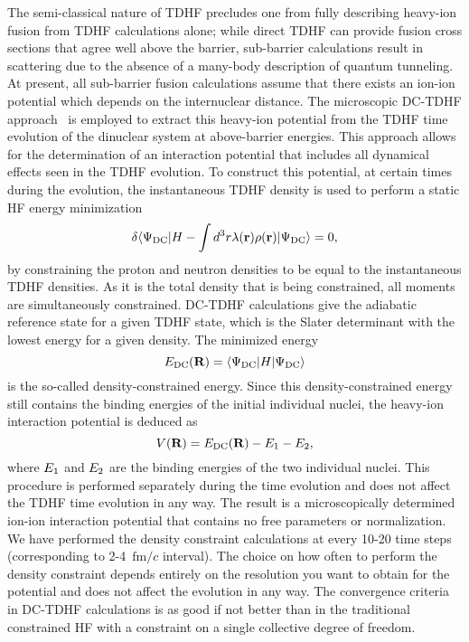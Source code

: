 \documentclass[aps,prc,twocolumn,showpacs,superscriptaddress,longbibliography,floatfix,10pt]{revtex4-1}
\begin{document}
The semi-classical nature of TDHF precludes one from fully describing heavy-ion fusion from TDHF calculations alone; while direct TDHF can provide fusion cross sections that agree well above the barrier, sub-barrier calculations result in scattering due to the absence of a many-body description of quantum tunneling.
At present, all sub-barrier fusion calculations assume that there exists an ion-ion potential which depends on the internuclear distance.
The microscopic DC-TDHF approach~\cite{umar2006b} is employed to extract this heavy-ion potential from the TDHF time evolution of the dinuclear system at above-barrier energies.
This approach allows for the determination of an interaction potential that includes all dynamical effects seen in the TDHF evolution.
To construct this potential, at certain times during the evolution, the instantaneous TDHF density is used to perform a static HF energy minimization
\begin{equation}
\delta \langle \Psi_{\rm DC}|H-\int d^3r \lambda(\textbf{r})\rho(\textbf{r})|\Psi_{\rm DC}\rangle=0,
\end{equation}
by constraining the proton and neutron densities to be equal to the instantaneous TDHF densities. As it is the total density that is being constrained, all moments are simultaneously constrained.
DC-TDHF calculations give the adiabatic reference state for a given TDHF state, which is the Slater determinant with the lowest energy for a given density.
The minimized energy
\begin{equation}
E_{\rm {DC}}(\textbf R)=\langle \Psi_{\rm DC}|H|\Psi_{\rm DC}\rangle
\end{equation}
is the so-called density-constrained energy.
Since this density-constrained energy still contains the binding energies of the initial individual nuclei, the heavy-ion interaction potential is deduced as
\begin{equation}
V(\textbf R)=E_{\rm {DC}}(\textbf R)-E_{\rm {1}}-E_{\rm {2}},
\label{VB}
\end{equation}
where $E_{\rm {1}}$ and $E_{\rm {2}}$ are the binding energies of the two individual nuclei.
This procedure is performed separately during the time evolution and does not affect the TDHF time evolution in any way.
The result is a microscopically determined ion-ion interaction potential that contains no free parameters or normalization.
We have performed the density constraint calculations at every 10-20 time steps (corresponding to 2-4~$\mathrm {fm}/c$ interval).
The choice on how often to perform the density constraint depends entirely on the resolution you want to obtain for the potential and does not affect the evolution in any way.
The convergence criteria in DC-TDHF calculations is as good if not better than in the traditional constrained HF with a constraint on a single collective degree of freedom.
\end{document}

